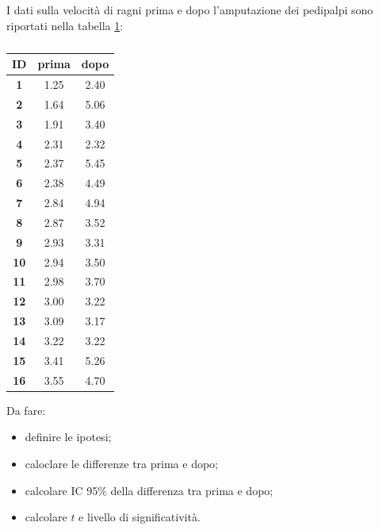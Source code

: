 \documentclass[10pt, draft]{book}
\newcounter{example}[section]
\begin{document}
\begin{example}\label{esamputazione}
    I dati sulla velocità di ragni prima e dopo l'amputazione dei pedipalpi sono riportati nella tabella \ref{tabamputazione}:
    \begin{table}[H]
        \centering
        \renewcommand\arraystretch{1.2}
        \begin{tabular}{c|c|c}
        \hline
        \textbf{ID} & \textbf{prima} & \textbf{dopo}\\ 
        \hline
        \textbf{1} & 1.25 & 2.40\\
        \hline
        \textbf{2} & 1.64 & 5.06\\
        \hline
        \textbf{3} & 1.91 & 3.40\\
        \hline
        \textbf{4} & 2.31 & 2.32\\
        \hline
        \textbf{5} & 2.37 & 5.45\\
        \hline
        \textbf{6} & 2.38 & 4.49\\
        \hline
        \textbf{7} & 2.84 & 4.94\\
        \hline
        \textbf{8} & 2.87 & 3.52\\
        \hline
        \textbf{9} & 2.93 & 3.31\\
        \hline
        \textbf{10} & 2.94 & 3.50\\
        \hline
        \textbf{11} & 2.98 & 3.70\\
        \hline
        \textbf{12} & 3.00 & 3.22\\
        \hline
        \textbf{13} & 3.09 & 3.17\\
        \hline
        \textbf{14} & 3.22 & 3.22\\
        \hline
        \textbf{15} & 3.41 & 5.26\\
        \hline
        \textbf{16} & 3.55 & 4.70\\
        \hline
        \end{tabular}
        \caption{\small{}}
        \label{tabamputazione}
    \end{table}\noindent
    Da fare:
    \begin{itemize}
        \item definire le ipotesi;
        \item caloclare le differenze tra prima e dopo;
        \item calcolare IC 95\% della differenza tra prima e dopo;
        \item calcolare $t$ e livello di significatività.
    \end{itemize}
\end{example}
\end{document}
